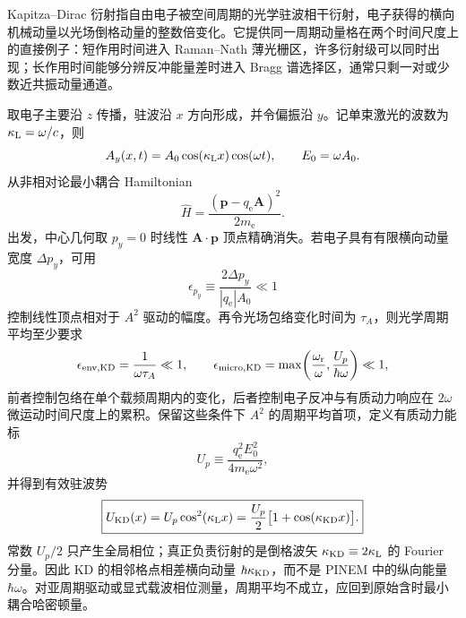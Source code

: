\begin{exbox}
Kapitza--Dirac 衍射指自由电子被空间周期的光学驻波相干衍射，电子获得的横向机械动量以光场倒格动量的整数倍变化。它提供同一周期动量格在两个时间尺度上的直接例子：短作用时间进入 Raman--Nath 薄光栅区，许多衍射级可以同时出现；长作用时间能够分辨反冲能量差时进入 Bragg 谱选择区，通常只剩一对或少数近共振动量通道。

取电子主要沿 $z$ 传播，驻波沿 $x$ 方向形成，并令偏振沿 $y$。记单束激光的波数为 $\kappa_{\rm L}=\omega/c$，则
\[
A_y(x,t)=A_0\cos(\kappa_{\rm L}x)\cos(\omega t),
\qquad E_0=\omega A_0.
\]
从非相对论最小耦合 Hamiltonian
\begin{equation}
\boxed{
\hat H=\frac{(\hat{\mathbf p}-q_{\mathrm e}\mathbf A)^2}{2m_{\mathrm e}}.}
\label{eq:kd_minimal_coupling_start}
\end{equation}
出发，中心几何取 $p_y=0$ 时线性 $\mathbf A\!\cdot\!\mathbf p$ 顶点精确消失。若电子具有有限横向动量宽度 $\Delta p_y$，可用
\begin{equation*}
 \epsilon_{p_y}\equiv\frac{2\Delta p_y}{|q_{\mathrm e}|A_0}\ll1
\end{equation*}
控制线性顶点相对于 $A^2$ 驱动的幅度。再令光场包络变化时间为 $\tau_A$，则光学周期平均至少要求
\begin{equation*}
 \epsilon_{\rm env,KD}=\frac1{\omega\tau_A}\ll1,
 \qquad
 \epsilon_{\rm micro,KD}
 =\max\!\left(\frac{\omega_{\rm r}}{\omega},
 \frac{U_p}{\hbar\omega}\right)\ll1,
\end{equation*}
前者控制包络在单个载频周期内的变化，后者控制电子反冲与有质动力响应在 $2\omega$ 微运动时间尺度上的累积。保留这些条件下 $A^2$ 的周期平均首项，定义有质动力能标
\[
U_p\equiv\frac{q_{\mathrm e}^2E_0^2}{4m_{\mathrm e}\omega^2},
\]
并得到有效驻波势
\begin{equation}
\boxed{
U_{\rm KD}(x)=U_p\cos^2(\kappa_{\rm L}x)
=\frac{U_p}{2}\bigl[1+\cos(\kappa_{\rm KD}x)\bigr].}
\label{eq:kd_ponderomotive_lattice}
\end{equation}
常数 $U_p/2$ 只产生全局相位；真正负责衍射的是倒格波矢 $\kappa_{\rm KD}\equiv2\kappa_{\rm L}$ 的 Fourier 分量。因此 KD 的相邻格点相差横向动量 $\hbar\kappa_{\rm KD}$，而不是 PINEM 中的纵向能量 $\hbar\omega$。对亚周期驱动或显式载波相位测量，周期平均不成立，应回到原始含时最小耦合哈密顿量。


\end{exbox}
